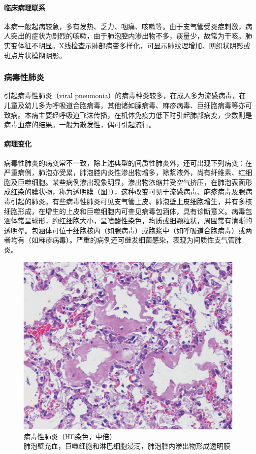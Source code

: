 \paragraph{临床病理联系}
本病一般起病较急，多有发热、乏力、咽痛、咳嗽等。由于支气管受炎症刺激，病人突出的症状为剧烈的咳嗽，由于肺泡腔内渗出物不多，痰量少，故常为干咳。肺实变体征不明显。X线检查示肺部病变多样化，可显示肺纹理增加、网织状阴影或斑点片状模糊阴影。

\subsubsection{病毒性肺炎}

引起病毒性肺炎（viral
pneumonia）的病毒种类较多，在成人多为流感病毒，在儿童及幼儿多为呼吸道合胞病毒，其他诸如腺病毒、麻疹病毒、巨细胞病毒等亦可致病。本病主要经呼吸道飞沫传播，在机体免疫力低下时引起肺部病变，少数则是病毒血症的结果。一般为散发性，偶可引起流行。

\paragraph{病理变化}
病毒性肺炎的病变常不一致，除上述典型的间质性肺炎外，还可出现下列病变：在严重病例，肺泡亦受累，肺泡腔内炎性渗出物增多，除浆液外，尚有纤维素、红细胞及巨噬细胞。某些病例渗出现象明显，渗出物浓缩并受空气挤压，在肺泡表面形成红染的膜状物，称为透明膜（图\ref{fig7-13}），这种改变可见于流感病毒、麻疹病毒及腺病毒引起的肺炎。有些病毒性肺炎可见支气管上皮、肺泡壁上皮细胞增生，并有多核细胞形成，在增生的上皮和巨噬细胞内可查见病毒包涵体，具有诊断意义。病毒包涵体常呈球形，约红细胞大小，呈嗜酸性染色，均质或细颗粒状，周围常有清晰的透明晕。包涵体可位于细胞核内（如腺病毒）或胞浆中（如呼吸道合胞病毒）或两者均有（如麻疹病毒）。严重的病例还可继发细菌感染，表现为间质性支气管肺炎。

\begin{figure}[!htbp]
 \centering
 \includegraphics{./images/Image00122.jpg}
 \captionsetup{justification=centering}
 \caption{病毒性肺炎（HE染色，中倍）\\ {\small 肺泡壁充血，巨噬细胞和淋巴细胞浸润，肺泡腔内渗出物形成透明膜}}
\label{fig7-13}
  \end{figure}

